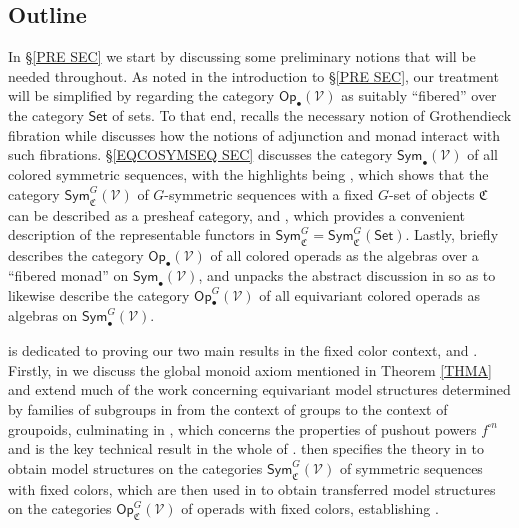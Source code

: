 \documentclass[a4paper,10pt
,draft
]{article}%
\numberwithin{equation}{section}
\numberwithin{figure}{section}
\theoremstyle{definition} %
\newcommand{\V}{\ensuremath{\mathcal V}}
\newcommand{\1}{\ensuremath{\mathbbm 1}}%
\begin{document}
\subsection{Outline}


In \S \ref{PRE SEC} we start by discussing some preliminary notions that will be needed throughout.
As noted in the introduction to 
\S \ref{PRE SEC}, our treatment will be simplified by regarding the category
$\mathsf{Op}_{\bullet}(\V)$
as suitably ``fibered'' over the category $\mathsf{Set}$
of sets.
To that end, 
\cite[\S \ref{OC-GROTFIB SEC}]{BP_FCOP}
recalls the necessary notion of Grothendieck fibration 
while \cite[\S \ref{OC-FIBCAT_SEC}]{BP_FCOP}
discusses how the notions of adjunction and monad %
interact with such fibrations.
%
\S \ref{EQCOSYMSEQ SEC}
discusses the category
$\mathsf{Sym}_{\bullet}(\V)$
of all colored symmetric sequences,
with the highlights being 
\cite[Prop. \ref{OC-EQUIVFNCON PROP}]{BP_FCOP},
which shows that the category
$\mathsf{Sym}^G_{\mathfrak{C}}(\V)$
of $G$-symmetric sequences with a fixed $G$-set of objects
$\mathfrak{C}$ can be described as a presheaf category,
and 
\cite[Prop. \ref{OC-REPALTDESC PROP}]{BP_FCOP},
which provides a convenient description of the representable functors in 
$\mathsf{Sym}^G_{\mathfrak{C}} = \mathsf{Sym}^G_{\mathfrak{C}}(\mathsf{Set})$.
%
Lastly, \cite[\S \ref{OC-EQCOSYMOP SEC}]{BP_FCOP}
briefly describes the category 
$\mathsf{Op}_{\bullet}(\V)$ 
of all colored operads as the algebras over a ``fibered monad''
on  
$\mathsf{Sym}_{\bullet}(\V)$,
and unpacks the abstract discussion in \cite[\S \ref{OC-FIBCAT_SEC}]{BP_FCOP}
so as to likewise describe the category 
$\mathsf{Op}_{\bullet}^G(\V)$ 
of all equivariant colored operads
as algebras on 
$\mathsf{Sym}^G_{\bullet}(\V)$.


\cite[\S \ref{OC-FIXCOL SEC}]{BP_FCOP}
is dedicated to proving our two main results in the fixed color context, \cite[Thm. \ref{OC-THMI}]{BP_FCOP} and \cite[Thm. \ref{OC-THMII}]{BP_FCOP}.
Firstly, in \cite[\S \ref{OC-EHT_SEC}]{BP_FCOP} we discuss the global monoid axiom mentioned in Theorem \ref{THMA}
and extend much of the work 
concerning equivariant model structures determined by families of subgroups in \cite[\S 6]{BP_geo}
from the context of groups to the context of groupoids,
culminating in 
\cite[Prop. \ref{OC-SIGMAWRGF PROP}]{BP_FCOP},
which concerns the properties of pushout powers $f^{\square n}$
and is the key technical result in the whole of \cite[\S \ref{OC-FIXCOL SEC}]{BP_FCOP}.
%
\cite[\S \ref{OC-SYMC_MS_SEC}]{BP_FCOP} then specifies the theory in
\cite[\S \ref{OC-EHT_SEC}]{BP_FCOP}
to obtain model structures on the categories
$\mathsf{Sym}^G_{\mathfrak{C}}(\V)$ of symmetric sequences with fixed colors,
which are then used in \cite[\S \ref{OC-OPC_MS_SEC}]{BP_FCOP}
to obtain transferred model structures on the 
categories
$\mathsf{Op}^G_{\mathfrak{C}}(\V)$
of operads with fixed colors, establishing 
\cite[Thm. \ref{OC-THMI}]{BP_FCOP}.
\end{document}
